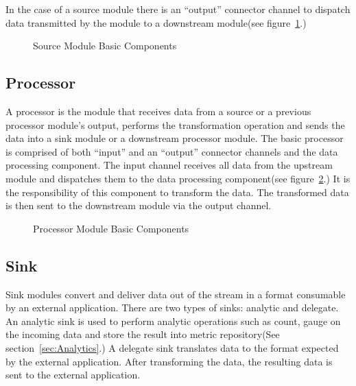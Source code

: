 \par

In the case of a source module there is an ``output'' connector channel to dispatch data
transmitted by the module to a downstream module(see figure~\ref{fig:sourcembc}.)

\par

\begin{figure}[ht]
\centering
{}
\caption{Source Module Basic Components}
\label{fig:sourcembc}
\end{figure}

\par

\subsection{Processor}
A processor is the module that receives data from a source or a previous processor
module's output, performs the transformation operation and sends the data
into a sink module or a downstream processor module. The basic processor is
comprised of both ``input'' and an ``output'' connector channels and the data processing component.
The input channel receives all data from the upstream module and dispatches them to
the data processing component(see figure~\ref{fig:processormbc}.) It is the responsibility of
this component to transform the data. The transformed data is then sent to the downstream module
via the output channel.

\par

\begin{figure}
\centering
{}
\caption{Processor Module Basic Components}
\label{fig:processormbc}
\end{figure}

\par

\subsection{Sink}
Sink modules convert and deliver data out of the stream in a format consumable by
an external application.  There are two types of sinks: analytic and delegate.
An analytic sink is used to perform analytic operations such as count, gauge on the
incoming data and store the result into metric repository(See section~\ref{sec:Analytics}.)
A delegate sink translates data to the format expected by the external application.
After transforming the data, the resulting data is sent to the external application.

